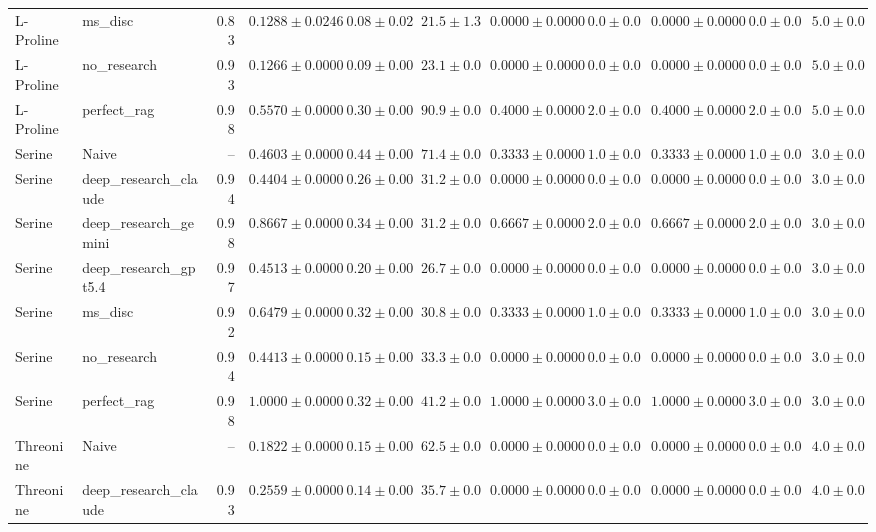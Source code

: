 \begin{table}[htbp]
\begin{tabular}{llrrrrrrrrr}
L-Proline & ms_disc & 0.83 & $0.1288 \pm 0.0246$ & $0.08 \pm 0.02$ & $21.5 \pm 1.3$ & $0.0000 \pm 0.0000$ & $0.0 \pm 0.0$ & $0.0000 \pm 0.0000$ & $0.0 \pm 0.0$ & $5.0 \pm 0.0$ \\
L-Proline & no_research & 0.93 & $0.1266 \pm 0.0000$ & $0.09 \pm 0.00$ & $23.1 \pm 0.0$ & $0.0000 \pm 0.0000$ & $0.0 \pm 0.0$ & $0.0000 \pm 0.0000$ & $0.0 \pm 0.0$ & $5.0 \pm 0.0$ \\
L-Proline & perfect_rag & 0.98 & \cellcolor{green!25}$0.5570 \pm 0.0000$ & $0.30 \pm 0.00$ & $90.9 \pm 0.0$ & $0.4000 \pm 0.0000$ & $2.0 \pm 0.0$ & $0.4000 \pm 0.0000$ & $2.0 \pm 0.0$ & $5.0 \pm 0.0$ \\
\midrule
Serine & Naive & -- & $0.4603 \pm 0.0000$ & $0.44 \pm 0.00$ & $71.4 \pm 0.0$ & $0.3333 \pm 0.0000$ & $1.0 \pm 0.0$ & $0.3333 \pm 0.0000$ & $1.0 \pm 0.0$ & $3.0 \pm 0.0$ \\
Serine & deep_research_claude & 0.94 & \cellcolor{red!25}$0.4404 \pm 0.0000$ & $0.26 \pm 0.00$ & $31.2 \pm 0.0$ & $0.0000 \pm 0.0000$ & $0.0 \pm 0.0$ & $0.0000 \pm 0.0000$ & $0.0 \pm 0.0$ & $3.0 \pm 0.0$ \\
Serine & deep_research_gemini & 0.98 & $0.8667 \pm 0.0000$ & $0.34 \pm 0.00$ & $31.2 \pm 0.0$ & $0.6667 \pm 0.0000$ & $2.0 \pm 0.0$ & $0.6667 \pm 0.0000$ & $2.0 \pm 0.0$ & $3.0 \pm 0.0$ \\
Serine & deep_research_gpt5.4 & 0.97 & $0.4513 \pm 0.0000$ & $0.20 \pm 0.00$ & $26.7 \pm 0.0$ & $0.0000 \pm 0.0000$ & $0.0 \pm 0.0$ & $0.0000 \pm 0.0000$ & $0.0 \pm 0.0$ & $3.0 \pm 0.0$ \\
Serine & ms_disc & 0.92 & $0.6479 \pm 0.0000$ & $0.32 \pm 0.00$ & $30.8 \pm 0.0$ & $0.3333 \pm 0.0000$ & $1.0 \pm 0.0$ & $0.3333 \pm 0.0000$ & $1.0 \pm 0.0$ & $3.0 \pm 0.0$ \\
Serine & no_research & 0.94 & $0.4413 \pm 0.0000$ & $0.15 \pm 0.00$ & $33.3 \pm 0.0$ & $0.0000 \pm 0.0000$ & $0.0 \pm 0.0$ & $0.0000 \pm 0.0000$ & $0.0 \pm 0.0$ & $3.0 \pm 0.0$ \\
Serine & perfect_rag & 0.98 & \cellcolor{green!25}$1.0000 \pm 0.0000$ & $0.32 \pm 0.00$ & $41.2 \pm 0.0$ & $1.0000 \pm 0.0000$ & $3.0 \pm 0.0$ & $1.0000 \pm 0.0000$ & $3.0 \pm 0.0$ & $3.0 \pm 0.0$ \\
\midrule
Threonine & Naive & -- & \cellcolor{red!25}$0.1822 \pm 0.0000$ & $0.15 \pm 0.00$ & $62.5 \pm 0.0$ & $0.0000 \pm 0.0000$ & $0.0 \pm 0.0$ & $0.0000 \pm 0.0000$ & $0.0 \pm 0.0$ & $4.0 \pm 0.0$ \\
Threonine & deep_research_claude & 0.93 & $0.2559 \pm 0.0000$ & $0.14 \pm 0.00$ & $35.7 \pm 0.0$ & $0.0000 \pm 0.0000$ & $0.0 \pm 0.0$ & $0.0000 \pm 0.0000$ & $0.0 \pm 0.0$ & $4.0 \pm 0.0$ \\

\end{tabular}
\end{table}
